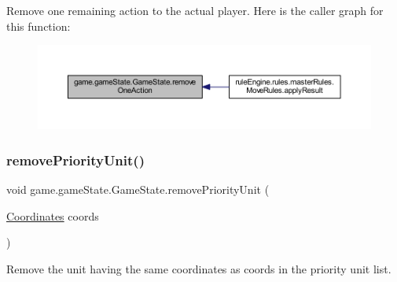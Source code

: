Remove one remaining action to the actual player. Here is the caller graph for this function\+:
\nopagebreak
\begin{figure}[H]
\begin{center}
\leavevmode
\includegraphics[width=350pt]{classgame_1_1game_state_1_1_game_state_af28ff27a89c8b57b67919e5cf17982c5_icgraph}
\end{center}
\end{figure}
\mbox{\label{classgame_1_1game_state_1_1_game_state_a97278bc7001044fe8be64c4a9e890867}} 
\subsubsection{\texorpdfstring{remove\+Priority\+Unit()}{removePriorityUnit()}}
{\footnotesize\ttfamily void game.\+game\+State.\+Game\+State.\+remove\+Priority\+Unit (\begin{DoxyParamCaption}\item[{\mbox{\hyperlink{classrule_engine_1_1_coordinates}{Coordinates}}}]{coords }\end{DoxyParamCaption})\hspace{0.3cm}{\ttfamily [inline]}}

Remove the unit having the same coordinates as coords in the priority unit list.


